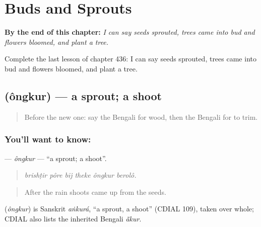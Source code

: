 
\chapter{Buds and Sprouts}
\label{ch:bn-buds-and-sprouts}

\begin{chapteropening}
\textbf{By the end of this chapter:} \emph{I can say seeds sprouted, trees came into bud and flowers bloomed, and plant a tree.}

Complete the last lesson of chapter 436: I can say seeds sprouted, trees came into bud and flowers bloomed, and plant a tree.
\end{chapteropening}

\section[\texorpdfstring{\bn{অঙ্কুর} (ôngkur)}{অঙ্কুর (ôngkur)}]{ (ôngkur) — a sprout; a shoot}

\label{lesson:BN-C436-ongkur}



\begin{quote}
Before the new one: say the Bengali for wood, then the Bengali for to trim.
\end{quote}

\subsection*{You'll want to know: }
\textbf{} — \emph{ôngkur} — \textquotedblleft{}a sprout; a shoot\textquotedblright{}.

\begin{quote}
     
\end{quote}

\begin{quote}
\emph{brishṭir pôre bīj theke ôngkur berolô.}
\end{quote}

\begin{quote}
After the rain shoots came up from the seeds.
\end{quote}

\begin{cousinweb}
\textbf{} (\emph{ôngkur}) is Sanskrit \emph{aṅkurá}, \textquotedblleft{}a sprout, a shoot\textquotedblright{} (CDIAL 109), taken over whole; CDIAL also lists the inherited Bengali \emph{ã̄kur}.
\end{cousinweb}

